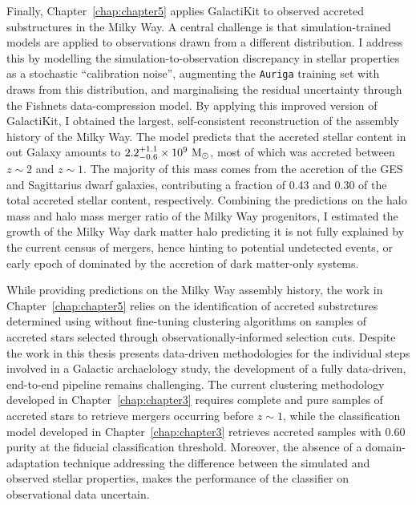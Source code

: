 Finally, Chapter~\ref{chap:chapter5} applies GalactiKit to observed accreted substructures in the Milky Way. 
A central challenge is that simulation-trained models are applied to observations drawn from a different 
distribution. I address this by modelling the simulation-to-observation discrepancy in stellar properties as a 
stochastic ``calibration noise'', augmenting the \texttt{Auriga} training set with draws from this distribution, 
and marginalising the residual uncertainty through the Fishnets data-compression model. 
By applying this improved version of GalactiKit, I obtained the largest,
self-consistent reconstruction of the assembly history of the Milky Way. The model predicts that the accreted stellar content in out Galaxy
amounts to $2.2^{+1.1}_{-0.6} \times 10^{9}~\rm{M_{\ensuremath{\odot}}}$, most of which was accreted between $z\sim2$ and $z\sim1$. The majority 
of this mass comes from the accretion of the GES and Sagittarius dwarf galaxies, contributing a fraction of 0.43 and 0.30 of the total accreted
stellar content, respectively. Combining the predictions on the halo mass and halo mass merger ratio of the Milky Way progenitors, 
I estimated the growth of the Milky Way dark matter halo predicting it is not fully explained by the current census of mergers, hence
hinting to potential undetected events, or early epoch of dominated by the accretion of dark matter-only systems.  

\bigskip

While providing predictions on the Milky Way assembly history, the work in Chapter~\ref{chap:chapter5} relies on
the identification of accreted substrctures determined using without fine-tuning
clustering algorithms on samples of accreted stars selected through observationally-informed selection cuts. 
Despite the work in this thesis presents data-driven methodologies for the individual steps involved in 
a Galactic archaelology study, the development of a fully data-driven, end-to-end pipeline remains challenging.
The current clustering methodology developed in Chapter~\ref{chap:chapter3} requires complete and pure samples of accreted
stars to retrieve mergers occurring before $z\sim1$, while the classification model developed in Chapter~\ref{chap:chapter3}
retrieves accreted samples with 0.60 purity
at the fiducial classification threshold. Moreover, the absence of a domain-adaptation technique addressing the 
difference between the simulated and observed stellar properties, makes the performance of the classifier on observational data uncertain. 

